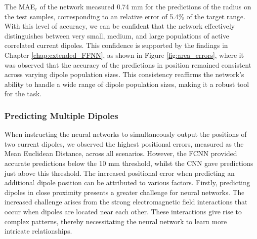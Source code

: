 \documentclass[a4paper, UKenglish, 11pt]{uiomaster}
\begin{document}
The MAE$_{r}$ of the network measured 0.74 mm for the predictions of the radius on the test samples, corresponding to an relative error of 5.4$\%$ of the target range. With this level of accuracy, we can be confident that the network effectively distinguishes between very small, medium, and large populations of active correlated current dipoles. This confidence is supported by the findings in Chapter \ref{chap:extended_FFNN}, as shown in Figure \ref{fig:area_errors}, where it was observed that the accuracy of the predictions in position remained consistent across varying dipole population sizes. This consistency reaffirms the network's ability to handle a wide range of dipole population sizes, making it a robust tool for the task.


\subsubsection{Predicting Multiple Dipoles}
When instructing the neural networks to simultaneously output the positions of two current dipoles, we observed the highest positional errors, measured as the Mean Euclidean Distance, across all scenarios. However, the FCNN provided accurate predictions below the 10 mm threshold, whilst the CNN gave predictions just above this threshold.
The increased positional error when predicting an additional dipole position can be attributed to various factors. Firstly, predicting dipoles in close proximity presents a greater challenge for neural networks. The increased challenge arises from the strong electromagnetic field interactions that occur when dipoles are located near each other.  These interactions give rise to complex patterns, thereby necessitating the neural network to learn more intricate relationships.
\end{document}
